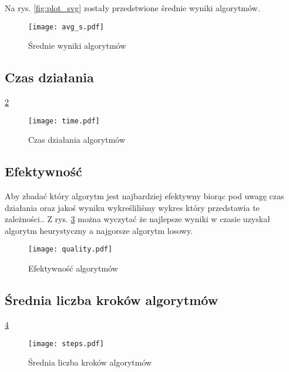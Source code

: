 \documentclass{article}
\begin{document}
Na rys. \ref{fig:plot_svg} zostały przedstwione średnie wyniki algorytmów.

\begin{figure} 
\begin{center}
\texttt{[image: avg\_s.pdf]}
\end{center}
\caption{Średnie wyniki algorytmów}
\label{fig:plot_avg}
\end{figure}

\subsection{Czas działania}

\ref{fig:plot_time}

\begin{figure} 
\begin{center}
\texttt{[image: time.pdf]}
\end{center}
\caption{Czas działania algorytmów}
\label{fig:plot_time}
\end{figure}

\subsection{Efektywność}

Aby zbadać który algorytm jest najbardziej efektywny biorąc pod uwagę czas działania oraz jakoś wyniku wykreśliliśmy wykres który przedstawia te zależności.. Z rys. \ref{fig:plot_quality} można wyczytać że najlepsze wyniki w czasie uzyskał algorytm heurystyczny a najgorsze algorytm losowy.

\begin{figure} 
\begin{center}
\texttt{[image: quality.pdf]}
\end{center}
\caption{Efektywność algorytmów}
\label{fig:plot_quality}
\end{figure}

\subsection{Średnia liczba kroków algorytmów}

\ref{fig:plot_steps}

\begin{figure} 
\begin{center}
\texttt{[image: steps.pdf]}
\end{center}
\caption{Średnia liczba kroków algorytmów}
\label{fig:plot_steps}
\end{figure}
\end{document}
